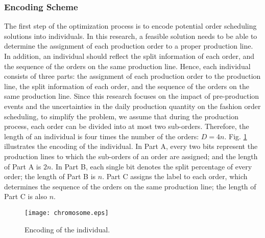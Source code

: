 \documentclass[journal]{IEEEtran}
\theoremstyle{definition}
\begin{document}
\subsubsection{Encoding Scheme}
The first step of the optimization process is to encode potential order scheduling solutions into individuals. In this research, a feasible solution needs to be able to determine the assignment of each production order to a proper production line. In addition, an individual should reflect the split information of each order, and the sequence of the orders on the same production line. Hence, each individual consists of three parts: the assignment of each production order to the production line, the split information of each order, and the sequence of the orders on the same production line. Since this research focuses on the impact of pre-production events and the uncertainties in the daily production quantity on the fashion order scheduling, to simplify the problem, we assume that during the production process, each order can be divided into at most two sub-orders. Therefore, the length of an individual is four times the number of the orders: $D=4n$. Fig. \ref{chro} illustrates the encoding of the individual. In Part A, every two bits represent the production lines to which the sub-orders of an order are assigned; and the length of Part A is $2n$. In Part B, each single bit denotes the split percentage of every order; the length of Part B is $n$. Part C assigns the label to each order, which determines the sequence of the orders on the same production line; the length of Part C is also $n$.
\begin{figure}[!htbp]
\begin{minipage}[t]{1\linewidth}
\centering
\texttt{[image: chromosome.eps]}
\caption{Encoding of the individual.} \label{chro}
\end{minipage}
\end{figure}
\end{document}
